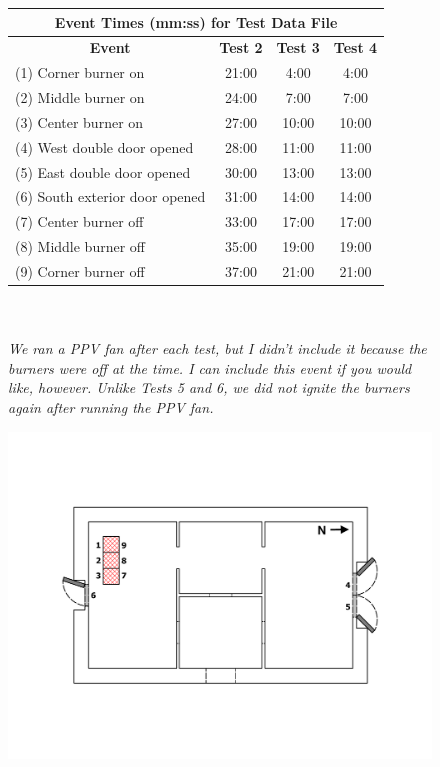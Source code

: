 \documentclass[12pt,oneside]{book}
\begin{document}
\begin{figure}[!ht]
\begin{minipage}[b]{0.8\columnwidth}
	\begin{flushleft}
	\small
	\begin{tabular}{lccc}
	\multicolumn{4}{c}{\normalsize Event Times (mm:ss) for Test Data File} \\
	\toprule
	\multicolumn{1}{c}{\textbf{Event}} & \textbf{Test 2} & \textbf{Test 3} & \textbf{Test 4} \\
	\midrule
	(1) Corner burner on 			& 	21:00		  &		4:00		&		4:00	  \\
	(2) Middle burner on 			&   24:00		  &		7:00		&		7:00	  \\
	(3) Center burner on 			&   27:00		  &	   10:00		&	   10:00	  \\
	(4) West double door opened 	&   28:00		  &    11:00		&	   11:00	  \\
	(5) East double door opened 	&   30:00		  &    13:00		&	   13:00	  \\
	(6) South exterior door opened 	&   31:00		  &    14:00		&	   14:00	  \\
	(7) Center burner off 			&   33:00		  &    17:00		&	   17:00	  \\
	(8) Middle burner off 			&   35:00		  &    19:00		&	   19:00	  \\
	(9) Corner burner off 			&   37:00		  &    21:00		&	   21:00	  \\
	\bottomrule
	\end{tabular}
	\\~\\
	\textit{We ran a PPV fan after each test, but I didn't include it because the burners were off at the time. I can include this event if you would like, however. Unlike Tests 5 and 6, we did not ignite the burners again after running the PPV fan.}
	\end{flushleft}
\end{minipage}
\begin{minipage}[b]{0.9\columnwidth}
	\vspace{15pt}
	\centering
	\includegraphics[width=\columnwidth]{../Figures/Floor_Plans/East_Structure_Test_4}

\end{minipage}
\end{figure}
\end{document}

